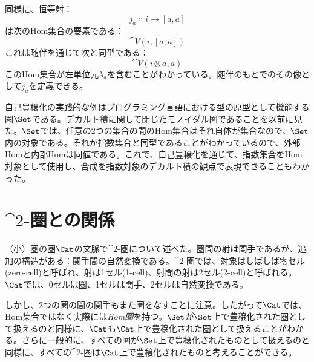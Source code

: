 同様に、恒等射：
\[j_a \Colon i \to [a, a]\]
は次のHom集合の要素である：
\[\cat{V}(i, [a, a])\]
これは随伴を通じて次と同型である：
\[\cat{V}(i \otimes a, a)\]
このHom集合が左単位元$\lambda_a$を含むことがわかっている。随伴のもとでのその像として$j_a$を定義できる。

自己豊穣化の実践的な例はプログラミング言語における型の原型として機能する圏$\Set$である。デカルト積に関して閉じたモノイダル圏であることを以前に見た。$\Set$では、任意の2つの集合の間のHom集合はそれ自体が集合なので、$\Set$内の対象である。それが指数集合と同型であることがわかっているので、外部Homと内部Homは同値である。これで、自己豊穣化を通じて、指数集合をHom対象として使用し、合成を指数対象のデカルト積の観点で表現できることもわかった。

\section{$\cat{2}$-圏との関係}

（小）圏の圏$\Cat$の文脈で$\cat{2}$-圏について述べた。圏間の射は関手であるが、追加の構造がある：関手間の自然変換である。$\cat{2}$-圏では、対象はしばしば零セル(zero-cell)と呼ばれ、射は1セル(1-cell)、射間の射は2セル(2-cell)と呼ばれる。$\Cat$では、0セルは圏、1セルは関手、2セルは自然変換である。

しかし、2つの圏の間の関手もまた圏をなすことに注意。したがって$\Cat$では、Hom集合ではなく実際には\emph{Hom圏}を持つ。$\Set$が$\Set$上で豊穣化された圏として扱えるのと同様に、$\Cat$も$\Cat$上で豊穣化された圏として扱えることがわかる。さらに一般的に、すべての圏が$\Set$上で豊穣化されたものとして扱えるのと同様に、すべての$\cat{2}$-圏は$\Cat$上で豊穣化されたものと考えることができる。
